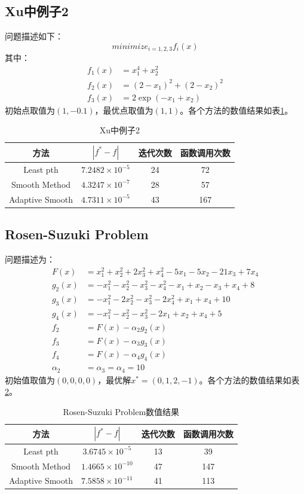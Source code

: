 \documentclass{ctexart}
\begin{document}
\subsection{Xu\cite{Xu2001}中例子2}
问题描述如下：
\[minimize_{i=1,2,3}f_i(x)\]
其中：
\begin{align}
	f_1(x) &= x_1^4+x_2^2\\
	f_2(x) &= (2-x_1)^2 + (2-x_2)^2\\
	f_3(x) &= 2\exp(-x_1+x_2)
\end{align}
初始点取值为$(1,-0.1)$，最优点取值为$(1,1)$。各个方法的数值结果如表\ref{tab:xu2}。
\begin{table}[htpb]
	\centering
	\caption{Xu中例子2}
	\label{tab:xu2}
	\begin{tabular}{c c c c}
	\hline
	方法 & $|f^*-f|$ & 迭代次数 & 函数调用次数 \\\hline
	Least pth & $7.2482\times 10^{-5}$ & 24 & 72 \\
	Smooth Method & $4.3247\times 10^{-7}$ &28 & 57\\
	Adaptive Smooth & $4.7311\times 10^{-5}$ & 43 & 167 \\
	\hline
	\end{tabular}
\end{table}
\subsection{Rosen-Suzuki Problem}
问题描述为：
\begin{align}
	F(x)&=x_1^2+x_2^2+2x_3^2+x_4^2-5x_1-5x_2-21x_3+7x_4\\
	g_2(x)&=-x_1^2-x_2^2-x_3^2-x_4^2-x_1+x_2-x_3+x_4+8\\
	g_3(x)&=-x_1^2-2x_2^2-x_3^2-2x_4^2+x_1+x_4+10\\
	g_4(x)&=-x_1^2-x_2^2-x_3^2-2x_1+x_2+x_4+5\\
	f_2&=F(x)-\alpha_2g_2(x)\\
	f_3&=F(x)-\alpha_3g_3(x)\\
	f_4&=F(x)-\alpha_4g_4(x)\\
	\alpha_2&=\alpha_3=\alpha_4=10
\end{align}
初始值取值为$(0,0,0,0)$，最优解$x^*=(0,1,2,-1)$。各个方法的数值结果如表\ref{tab:rspro}。
\begin{table}[htpb]
	\centering
	\caption{Rosen-Suzuki Problem数值结果}
	\label{tab:rspro}
	\begin{tabular}{c c c c}
	\hline
	方法 & $|f^*-f|$ & 迭代次数 & 函数调用次数 \\\hline
	Least pth & $3.6745\times 10^{-5}$ & 13 & 39\\
	Smooth Method & $1.4665\times 10^{-10}$ & 47 & 147\\
	Adaptive Smooth & $7.5858\times 10^{-11}$ &41 &113 \\
	\hline
	\end{tabular}
\end{table}
\end{document}
